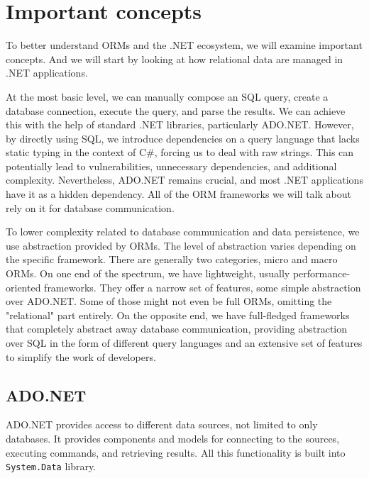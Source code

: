 \section{Important concepts}
To better understand ORMs and the .NET ecosystem, we will examine important concepts. And we will start by looking at how relational data are managed in .NET applications. 

At the most basic level, we can manually compose an SQL query, create a database connection, execute the query, and parse the results. We can achieve this with the help of standard .NET libraries, particularly ADO.NET. However, by directly using SQL, we introduce dependencies on a query language that lacks static typing in the context of C\#, forcing us to deal with raw strings. This can potentially lead to vulnerabilities, unnecessary dependencies, and additional complexity. Nevertheless, ADO.NET remains crucial, and most .NET applications have it as a hidden dependency. All of the ORM frameworks we will talk about rely on it for database communication. 

To lower complexity related to database communication and data persistence, we use abstraction provided by ORMs.
The level of abstraction varies depending on the specific framework. There are generally two categories, micro and macro ORMs. On one end of the spectrum, we have lightweight, usually performance-oriented frameworks. They offer a narrow set of features, some simple abstraction over ADO.NET. Some of those might not even be full ORMs, omitting the "relational" part entirely. On the opposite end, we have full-fledged frameworks that completely abstract away database communication, providing abstraction over SQL in the form of different query languages and an extensive set of features to simplify the work of developers. \cite{Dapper}

\subsection{ADO.NET}
ADO.NET provides access to different data sources, not limited to only databases. It provides components and models for connecting to the sources, executing commands, and retrieving results. All this functionality is built into \texttt{System.Data} library. \cite{ADONET}

